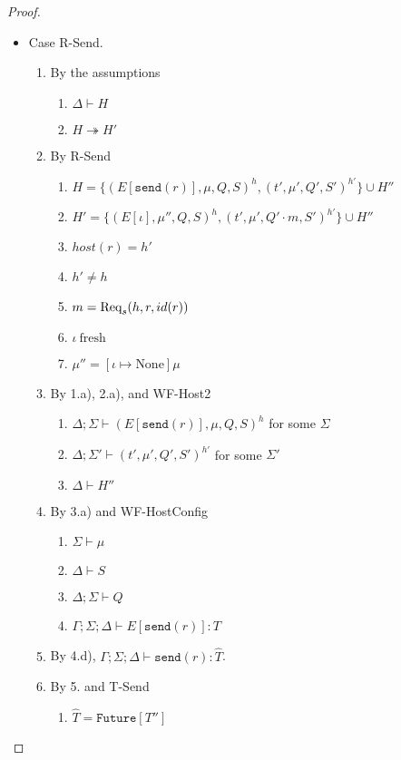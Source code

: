 \begin{proof}
\begin{itemize}
\item Case R-Send.
\begin{enumerate}
\item By the assumptions
  \begin{enumerate}[label=(\alph*)]
  \item $\Delta \vdash H$
  \item $H \twoheadrightarrow H'$
  \end{enumerate}
\item By R-Send
  \begin{enumerate}[label=(\alph*)]
  \item $H = \{ (E[\texttt{send}(r)], \mu, Q, S)^h, (t', \mu', Q', S')^{h'} \} \cup H''$
  \item $H' = \{ (E[\iota], \mu'', Q, S)^h, (t', \mu', Q' \cdot m, S')^{h'} \} \cup H''$
  \item $host(r) = h'$
  \item $h' \neq h$
  \item $m = {\textrm{Req}_s(h, r, id(r))}$
  \item $\iota~\text{fresh}$
  \item $\mu'' = [\iota \mapsto \text{None}]\mu$
  \end{enumerate}
\item By 1.a), 2.a), and WF-Host2
  \begin{enumerate}[label=(\alph*)]
  \item $\Delta ; \Sigma \vdash (E[\texttt{send}(r)], \mu, Q, S)^h$ for some $\Sigma$
  \item $\Delta ; \Sigma' \vdash (t', \mu', Q', S')^{h'}$ for some $\Sigma'$
  \item $\Delta \vdash H''$
  \end{enumerate}
\item By 3.a) and WF-HostConfig
  \begin{enumerate}[label=(\alph*)]
  \item $\Sigma \vdash \mu$
  \item $\Delta \vdash S$
  \item $\Delta ; \Sigma \vdash Q$
  \item $\Gamma ; \Sigma ; \Delta \vdash E[\texttt{send}(r)] : T$
  \end{enumerate}
\item By 4.d), $\Gamma ; \Sigma ; \Delta \vdash \texttt{send}(r) : \hat{T}$.
\item By 5. and T-Send
  \begin{enumerate}[label=(\alph*)]
  \item $\hat{T} = \texttt{Future}[T'']$

\end{enumerate}
\end{enumerate}
\end{itemize}
\end{proof}
